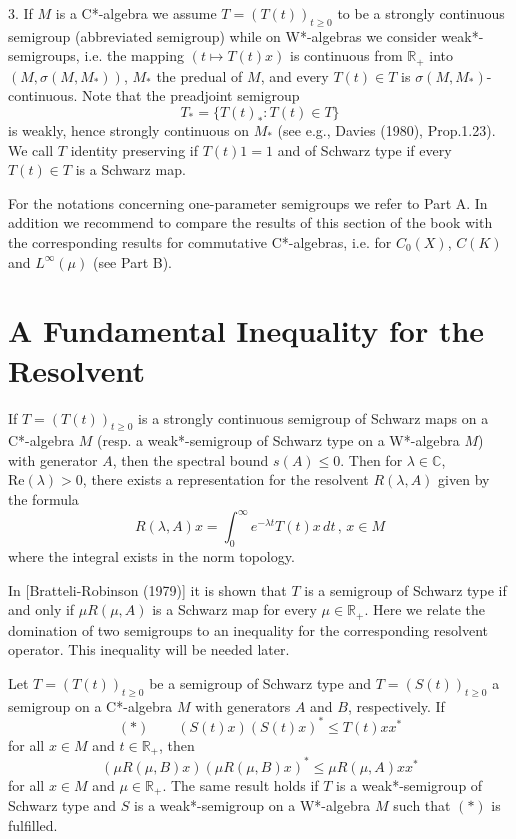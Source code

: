 3. If $ M $ is a C*-algebra we assume $ T = (T(t))_{t \geq 0} $ to be a strongly continuous semigroup (abbreviated semigroup) while on W*-algebras we consider weak*-semigroups, i.e. the mapping $ (t \mapsto T(t)x) $ is continuous from $ \mathbb{R}_+ $ into $ (M,\sigma(M,M_*)) $, $ M_* $ the predual of $ M $, and every $ T(t) \in T $ is $ \sigma(M,M_*) $-continuous.
Note that the preadjoint semigroup
\[
T_* = \{ T(t)_* : T(t) \in T \}
\]
is weakly, hence strongly continuous on $ M_* $ (see e.g., Davies (1980), Prop.1.23).
We call $ T $ identity preserving if $ T(t)1 = 1 $ and of Schwarz type if every $ T(t) \in T $ is a Schwarz map.

For the notations concerning one-parameter semigroups we refer to Part A.
In addition we recommend to compare the results of this section of the book with the corresponding results for commutative C*-algebras, i.e. for $ C_0(X) $, $ C(K) $ and $ L^\infty(\mu) $ (see Part B).

\section{A Fundamental Inequality for the Resolvent}\label{sec:fundamental}

If $ T = (T(t))_{t\geq0} $ is a strongly continuous semigroup of Schwarz maps on a C*-algebra $ M $ (resp. a weak*-semigroup of Schwarz type on a W*-algebra $ M $) with generator $ A $, then the spectral bound $ s(A) \leq 0 $.
Then for $ \lambda \in \mathbb{C} $, $ \text{Re}(\lambda) > 0 $, there exists a representation for the resolvent $ R(\lambda,A) $ given by the formula
\[
R(\lambda,A)x = \int_0^\infty e^{-\lambda t} T(t)x \, dt \, , \, x \in M
\]
where the integral exists in the norm topology.



In [Bratteli-Robinson (1979)] it is shown that $ T $ is a semigroup of Schwarz type if and only if $ \mu R(\mu,A) $ is a Schwarz map for every $ \mu \in \mathbb{R}_+ $.
Here we relate the domination of two semigroups to an inequality for the corresponding resolvent operator.
This inequality will be needed later.

\begin{theorem}\label{thm:2.1}
Let $ T = (T(t))_{t\geq0} $ be a semigroup of Schwarz type and $ T = (S(t))_{t\geq0} $ a semigroup on a C*-algebra $ M $ with generators $ A $ and $ B $, respectively.
If
\[
(*) \qquad (S(t)x)(S(t)x)^* \leq T(t)xx^*
\]
for all $ x \in M $ and $ t \in \mathbb{R}_+ $, then
\[
(\mu R(\mu,B)x)(\mu R(\mu,B)x)^* \leq \mu R(\mu,A)xx^*
\]
for all $ x \in M $ and $ \mu \in \mathbb{R}_+ $.
The same result holds if $ T $ is a weak*-semigroup of Schwarz type and $ S $ is a weak*-semigroup on a W*-algebra $ M $ such that $ (*) $ is fulfilled.
\end{theorem}

